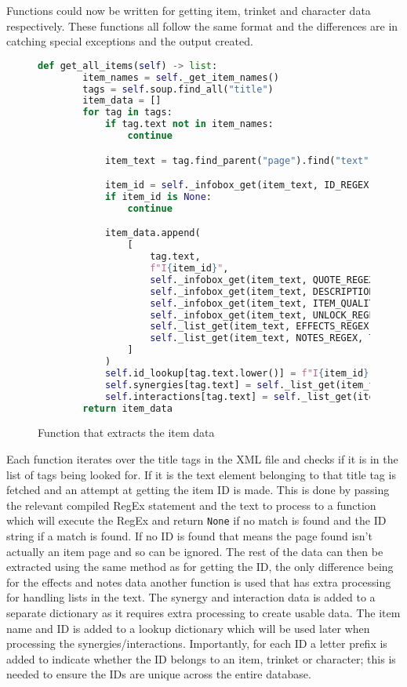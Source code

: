 Functions could now be written for getting item, trinket and character data respectively. These functions all follow the same format 
and the differences are in catching special exceptions and the output created.
\begin{figure}[H]
    \begin{lstlisting}[language=Python]
        def get_all_items(self) -> list:
        item_names = self._get_item_names()
        tags = self.soup.find_all("title")
        item_data = []
        for tag in tags:
            if tag.text not in item_names:
                continue

            item_text = tag.find_parent("page").find("text").text

            item_id = self._infobox_get(item_text, ID_REGEX)
            if item_id is None:
                continue

            item_data.append(
                [
                    tag.text,
                    f"I{item_id}",
                    self._infobox_get(item_text, QUOTE_REGEX),
                    self._infobox_get(item_text, DESCRIPTION_REGEX),
                    self._infobox_get(item_text, ITEM_QUALITY_REGEX),
                    self._infobox_get(item_text, UNLOCK_REGEX),
                    self._list_get(item_text, EFFECTS_REGEX, True),
                    self._list_get(item_text, NOTES_REGEX, True),
                ]
            )
            self.id_lookup[tag.text.lower()] = f"I{item_id}"
            self.synergies[tag.text] = self._list_get(item_text, SYNERGIES_REGEX)
            self.interactions[tag.text] = self._list_get(item_text, INTERACTIONS_REGEX)
        return item_data
    \end{lstlisting}
    \caption{Function that extracts the item data}
\end{figure}
Each function iterates over the title tags in the XML file and checks if it is in the list of tags being looked for. 
If it is the text element belonging to that title tag is fetched and an attempt at getting the item ID is made. This is done 
by passing the relevant compiled RegEx statement and the text to process to a function which will execute the RegEx and return \verb|None| 
if no match is found and the ID string if a match is found. If no ID is found that means the page found isn't actually an item page and so can be ignored.
The rest of the data can then be extracted using the same method as for getting the ID, the only difference being for the effects and notes data another function 
is used that has extra processing for handling lists in the text. The synergy and interaction data is added to a separate dictionary as it requires extra processing 
to create usable data. The item name and ID is added to a lookup dictionary which will be used later when processing the synergies/interactions.
Importantly, for each ID a letter prefix is added to indicate whether the ID belongs to an item, trinket or character; this is needed to ensure the IDs 
are unique across the entire database.


